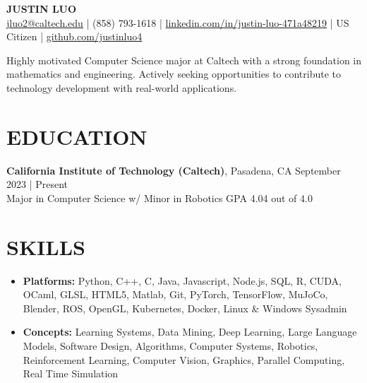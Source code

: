 \documentclass[letterpaper,10pt]{extarticle}
\begin{document}
\pagestyle{empty}

\begin{center}
\textbf{\Large JUSTIN LUO}\\[3pt] %
\href{mailto:jluo2@caltech.edu}{jluo2@caltech.edu} | (858) 793-1618 | \href{https://www.linkedin.com/in/justin-luo-471a48219}{linkedin.com/in/justin-luo-471a48219} | US Citizen | \href{https://github.com/justinluo4}{github.com/justinluo4}%
\end{center}
\begin{center}
Highly motivated Computer Science major at Caltech with a strong foundation in mathematics and engineering. Actively seeking opportunities to contribute to technology development with real-world applications.
\end{center}
\section*{EDUCATION}
\noindent
\textbf{California Institute of Technology (Caltech)}, Pasadena, CA \hfill September 2023 | Present\\ %
Major in Computer Science w/ Minor in Robotics \hfill GPA 4.04 out of 4.0


\section*{SKILLS}
\begin{itemize}
    \item \textbf{Platforms:} Python, C++, C, Java, Javascript, Node.js, SQL, R, CUDA, OCaml, GLSL, HTML5, Matlab, Git, PyTorch, TensorFlow, MuJoCo, Blender, ROS, OpenGL, Kubernetes, Docker, Linux \& Windows Sysadmin
    
    \item \textbf{Concepts:} Learning Systems, Data Mining, Deep Learning, Large Language Models, Software Design, Algorithms, Computer Systems, Robotics, Reinforcement Learning, Computer Vision, Graphics, Parallel Computing, Real Time Simulation
\end{itemize}



\end{document}
